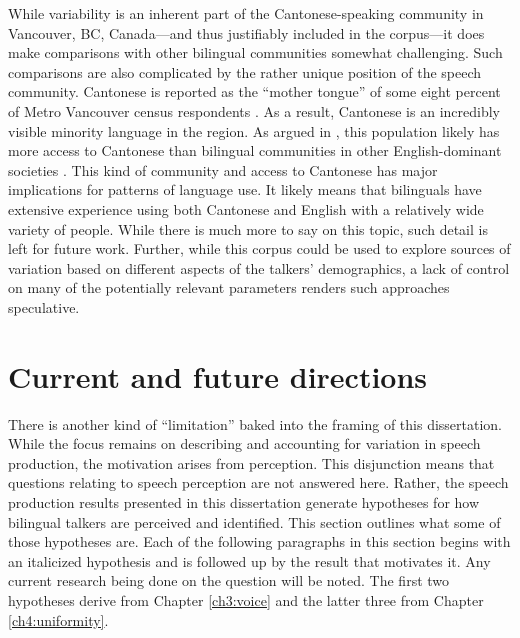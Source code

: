 While variability is an inherent part of the Cantonese-speaking community in Vancouver, BC, Canada---and thus justifiably included in the corpus---it does make comparisons with other bilingual communities somewhat challenging. Such comparisons are also complicated by the rather unique position of the speech community. Cantonese is reported as the ``mother tongue'' of some eight percent of Metro Vancouver census respondents \citep{statistics_2017_proportion}. As a result, Cantonese is an incredibly visible minority language in the region. As argued in \citet{chan_2020_lexically}, this population likely has more access to Cantonese than bilingual communities in other English-dominant societies \citep[e.g.,][]{bruggeman_2019_l1}. This kind of community and access to Cantonese has major implications for patterns of language use. It likely means that bilinguals have extensive experience using both Cantonese and English with a relatively wide variety of people. While there is much more to say on this topic, such detail is left for future work. Further, while this corpus could be used to explore sources of variation based on different aspects of the talkers' demographics, a lack of control on many of the potentially relevant parameters renders such approaches speculative. 

\section{Current and future directions}\label{ch5:sec:directions}

There is another kind of ``limitation'' baked into the framing of this dissertation. While the focus remains on describing and accounting for variation in speech production, the motivation arises from perception. This disjunction means that questions relating to speech perception are not answered here. Rather, the speech production results presented in this dissertation generate hypotheses for how bilingual talkers are perceived and identified. This section outlines what some of those hypotheses are. Each of the following paragraphs in this section begins with an italicized hypothesis and is followed up by the result that motivates it. Any current research being done on the question will be noted. The first two hypotheses derive from Chapter \ref{ch3:voice} and the latter three from Chapter \ref{ch4:uniformity}.

